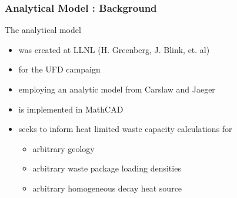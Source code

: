 
\begin{frame}[ctb!]
\frametitle{Analytical Model : Background}
The analytical  model
\begin{itemize} 
  \item was created at LLNL (H. Greenberg, J. Blink, et. al) \cite{hardin_generic_2011, sutton_investigations_2011, 
greenberg_application_2012}
  \item for the UFD campaign 
  \item employing an analytic model from Carslaw and Jaeger \cite{carslaw_conduction_1959} 
  \item is implemented in MathCAD \cite{ptc_mathcad_2010}
  \item seeks to inform heat limited waste capacity calculations for 
    \begin{itemize}
      \item arbitrary geology 
      \item arbitrary waste package loading densities
      \item arbitrary homogeneous decay heat source
    \end{itemize}
\end{itemize}
\end{frame}

